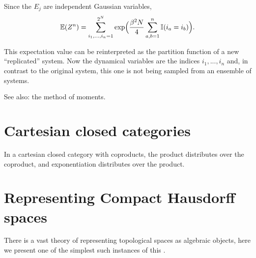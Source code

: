 \documentclass[11pt]{article}
\begin{document}
Since the $E_j$ are independent Gaussian variables,
$$
    \mathbb E(Z^n) = \sum_{i_1,...,i_n=1}^{2^N} \exp\Bigl(\frac{\beta^2N}{4} \sum_{a,b=1}^n \mathbb I(i_a=i_b)\Bigr).
$$

This expectation value can be reinterpreted as the partition
function of a new ``replicated'' system. Now the dynamical variables
are the indices $i_1,...,i_n$ and, in contrast to the original system,
this one is not being sampled from an ensemble of systems.

See also: the method of moments.

%

%
%

\section{Cartesian closed categories}

In a cartesian closed category with coproducts, 
the product distributes over the coproduct, and exponentiation distributes over the product.


%
%

\section{Representing Compact Hausdorff spaces}


There is a vast theory of representing topological spaces as
algebraic objects, here we present one of the simplest such
instances of this
\cite{Nagata1985}.

\end{document}

